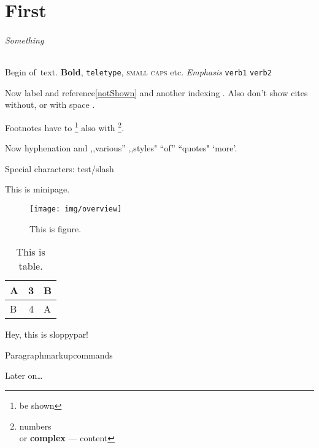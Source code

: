 \documentclass[draft]{book}
\begin{document}
\tableofcontents
\setcounter{page}{2142}

\chapter*{First}

\subparagraph*{Something}

Begin of~text. \textbf{Bold}, \texttt{teletype}, \textsc{small caps} etc.
\emph{Emphasis} \verb+verb1+ \verb!verb2!

Now label\label{notShown} and reference\ref{notShown} and
another\pageref{notShown} indexing . Also don't show
cites without\cite{notShown}, or with space \cite{notShown}.

Footnotes have to \footnote{be shown} also with \footnote[0]{numbers\\or
\textbf{complex} --- content}.

Now hy\-phe\-na\-tion and ,,various'' ,,styles" ``of'' ``quotes" `more'.

Special characters: test\slash{}slash

\begin{minipage}[t]{0.5\textwidth}
This is minipage.
\end{minipage}

\begin{figure}[htp]
	\centering
	\texttt{[image: img/overview]}
	\caption{This is figure.}
\end{figure}

\begin{table}[H]
\begin{tabular}{|l|r|l|}
\hline
A & 3 & B \\ \hline
B & 4 & A \\ \hline
\end{tabular}
\caption{This is table.}
\end{table}

\begin{sloppypar}
Hey, this is sloppypar!
\end{sloppypar}

Paragraph\linebreak[3]markup\linebreak{}commands

Later on\ldots

\cleardoublepage
{}
{}
\printindex
\end{document}
